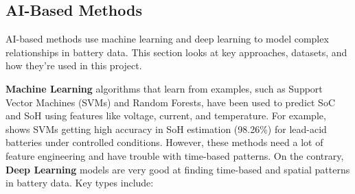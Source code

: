 \subsection{AI-Based Methods}
\label{subsec:ai_methods}
AI-based methods use machine learning and deep learning to model complex relationships in battery data. This section looks at key approaches, datasets, and how they're used in this project.

\textbf{Machine Learning} algorithms that learn from examples, such as Support Vector Machines (SVMs) and Random Forests, have been used to predict SoC and SoH using features like voltage, current, and temperature. For example, \cite{sun_simultaneous_2022} shows SVMs getting high accuracy in SoH estimation (98.26\%) for lead-acid batteries under controlled conditions. However, these methods need a lot of feature engineering and have trouble with time-based patterns. On the contrary, \textbf{Deep Learning} models are very good at finding time-based and spatial patterns in battery data. Key types include:
